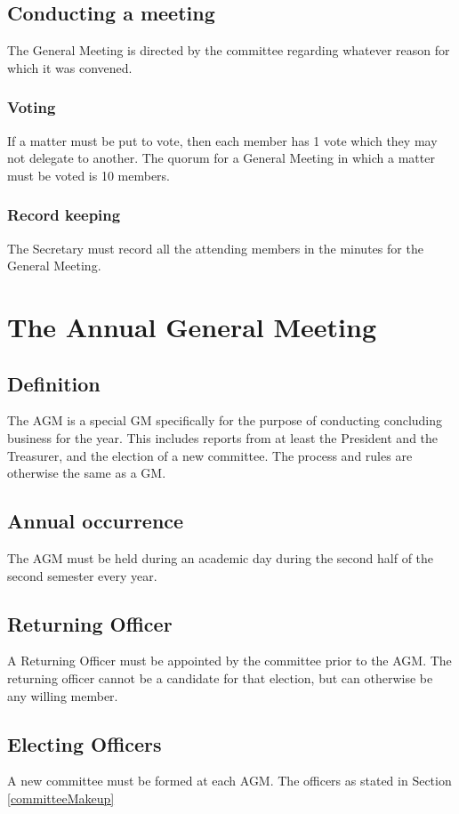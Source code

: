\documentclass[11pt]{article}
\begin{document}
\subsection{Conducting a meeting}
The General Meeting is directed by the committee regarding whatever reason for which it was convened.
\subsubsection{Voting}
If a matter must be put to vote, then each member has 1 vote which they may not delegate to another. The quorum for a General Meeting in which a matter must be voted is 10 members.
\subsubsection{Record keeping}
The Secretary must record all the attending members in the minutes for the General Meeting.

\section{The Annual General Meeting} \label{annualGeneralMeeting}
\subsection{Definition}
The AGM is a special GM specifically for the purpose of conducting concluding business for the year. This includes reports from at least the President and the Treasurer, and the election of a new committee. The process and rules are otherwise the same as a GM.
\subsection{Annual occurrence}
The AGM must be held during an academic day during the second half of the second semester every year.
\subsection{Returning Officer}
A Returning Officer must be appointed by the committee prior to the AGM. The returning officer cannot be a candidate for that election, but can otherwise be any willing member.
\subsection{Electing Officers}
A new committee must be formed at each AGM. The officers as stated in Section \ref{committeeMakeup}
\end{document}
